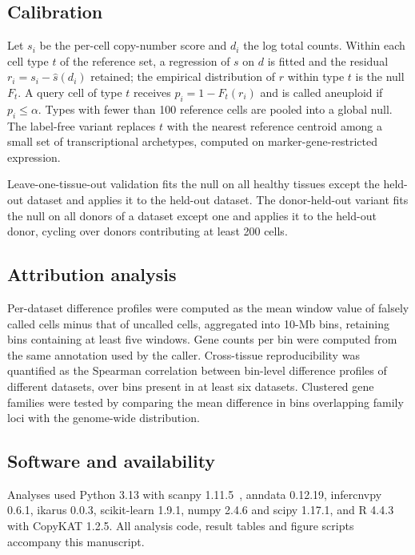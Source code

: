 \documentclass[11pt]{article}
\begin{document}
\subsection{Calibration}

Let $s_i$ be the per-cell copy-number score and $d_i$ the log total counts.
Within each cell type $t$ of the reference set, a regression of $s$ on $d$ is
fitted and the residual $r_i = s_i - \hat{s}(d_i)$ retained; the empirical
distribution of $r$ within type $t$ is the null $F_t$. A query cell of type
$t$ receives $p_i = 1 - F_t(r_i)$ and is called aneuploid if $p_i \le \alpha$.
Types with fewer than 100 reference cells are pooled into a global null. The
label-free variant replaces $t$ with the nearest reference centroid among a
small set of transcriptional archetypes, computed on marker-gene-restricted
expression.

Leave-one-tissue-out validation fits the null on all healthy tissues except
the held-out dataset and applies it to the held-out dataset. The
donor-held-out variant fits the null on all donors of a dataset except one
and applies it to the held-out donor, cycling over donors contributing at
least 200 cells.

\subsection{Attribution analysis}

Per-dataset difference profiles were computed as the mean window value of
falsely called cells minus that of uncalled cells, aggregated into 10-Mb
bins, retaining bins containing at least five windows. Gene counts per bin
were computed from the same annotation used by the caller. Cross-tissue
reproducibility was quantified as the Spearman correlation between bin-level
difference profiles of different datasets, over bins present in at least six
datasets. Clustered gene families were tested by comparing the mean
difference in bins overlapping family loci with the genome-wide distribution.

\subsection{Software and availability}

Analyses used Python 3.13 with scanpy 1.11.5~\cite{scanpy}, anndata 0.12.19, infercnvpy
0.6.1, ikarus 0.0.3, scikit-learn 1.9.1, numpy 2.4.6 and scipy 1.17.1, and R
4.4.3 with CopyKAT 1.2.5. All analysis code, result tables and figure scripts
accompany this manuscript.
\end{document}
